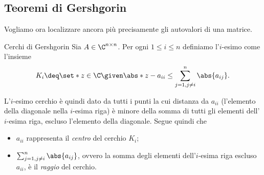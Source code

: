\subsection{Teoremi di Gershgorin}

Vogliamo ora localizzare ancora più precisamente gli autovalori di una matrice.

\begin{definition}{Cerchi di Gershgorin}{}
    Sia $A \in \Mat{\C, n, n}$. Per ogni $1 \leq i \leq n$ definiamo l'$i$-esimo  come l'insieme \[
        K_i \deq \set*{z \in \C \given \abs*{z - a_{ii}} \leq \sum_{j=1, j\neq i}^n \abs{a_{ij}}}.
    \]
\end{definition}

L'$i$-esimo cerchio è quindi dato da tutti i punti la cui distanza da $a_{ii}$ (l'elemento della diagonale nella $i$-esima riga) è minore della somma di tutti gli elementi dell'$i$-esima riga, escluso l'elemento della diagonale. Segue quindi che \begin{itemize}
    \item $a_{ii}$ rappresenta il \emph{centro} del cerchio $K_i$;
    \item $\sum_{j = 1, j\neq i}^n \abs{a_{ij}}$, ovvero la somma degli elementi dell'$i$-esima riga escluso $a_{ii}$, è il \emph{raggio} del cerchio.   
\end{itemize}

